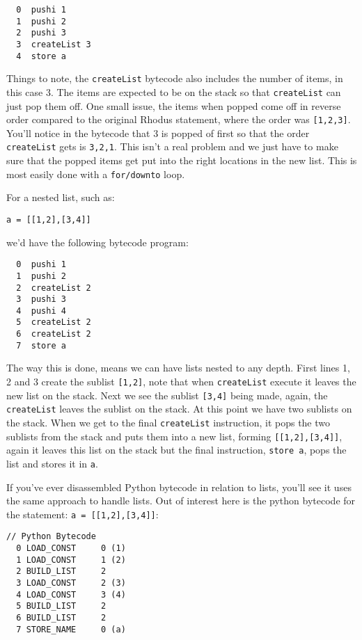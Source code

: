 \begin{lstlisting}
  0  pushi 1
  1  pushi 2
  2  pushi 3
  3  createList 3
  4  store a
\end{lstlisting}

Things to note, the {\tt createList} bytecode also includes the number of items, in this case 3. The items are expected to be on the stack so that {\tt createList} can just pop them off. One small issue, the items when popped come off in reverse order compared to the original Rhodus statement, where the order was {\tt [1,2,3]}. You'll notice in the bytecode that 3 is popped of first so that the order {\tt createList} gets is {\tt 3,2,1}. This isn't a real problem and we just have to make sure that the popped items get put into the right locations in the new list. This is most easily done with a {\tt for/downto} loop.

For a nested list, such as:

\begin{lstlisting}
a = [[1,2],[3,4]]
\end{lstlisting}

we'd have the following bytecode program:

\begin{lstlisting}
  0  pushi 1
  1  pushi 2
  2  createList 2
  3  pushi 3
  4  pushi 4
  5  createList 2
  6  createList 2
  7  store a
\end{lstlisting}

The way this is done, means we can have lists nested to any depth. First lines 1, 2 and 3 create the sublist {\tt [1,2]}, note that when {\tt createList} execute it leaves the new list on the stack. Next we see the sublist {\tt [3,4]} being made, again, the {\tt createList} leaves the sublist on the stack. At this point we have two sublists on the stack. When we get to the final {\tt createList} instruction, it pops the two sublists from the stack and puts them into a new list, forming {\tt [[1,2],[3,4]]}, again it leaves this list on the stack but the final instruction, {\tt store a}, pops the list and stores it in {\tt a}.

If you've ever disassembled Python bytecode in relation to lists, you'll see it uses the same approach to handle lists. Out of interest here is the python bytecode for the statement: {\tt a = [[1,2],[3,4]]}:

\begin{lstlisting}
// Python Bytecode
  0 LOAD_CONST     0 (1)
  1 LOAD_CONST     1 (2)
  2 BUILD_LIST     2
  3 LOAD_CONST     2 (3)
  4 LOAD_CONST     3 (4)
  5 BUILD_LIST     2
  6 BUILD_LIST     2
  7 STORE_NAME     0 (a)
\end{lstlisting}

